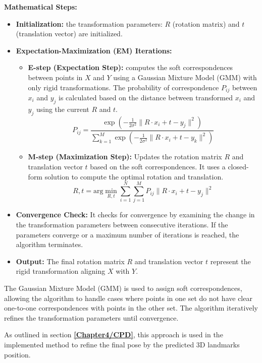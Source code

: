 \textbf{Mathematical Steps:}
\begin{itemize}
    \item \textbf{Initialization:} the transformation parameters: \(R\) (rotation matrix) and \(t\) (translation vector) are initialized.
    \item \textbf{Expectation-Maximization (EM) Iterations:}
    \begin{itemize}
        \item \textbf{E-step (Expectation Step):} computes the soft correspondences between points in \(X\) and \(Y\) using a Gaussian Mixture Model (GMM) with only rigid transformations. The probability of correspondence \(P_{ij}\) between \(x_i\) and \(y_j\) is calculated based on the distance between transformed \(x_i\) and \(y_j\) using the current \(R\) and \(t\).
        \begin{equation}
            P_{ij} = \frac{\exp\left(-\frac{1}{2\sigma^2}\|R \cdot x_i + t - y_j\|^2\right)}{\sum_{k=1}^M \exp\left(-\frac{1}{2\sigma^2}\|R \cdot x_i + t - y_k\|^2\right)}
        \end{equation}
        \item \textbf{M-step (Maximization Step):} Updates the rotation matrix \(R\) and translation vector \(t\) based on the soft correspondences. It uses a closed-form solution to compute the optimal rotation and translation.
        \begin{equation}
            R, t = \text{arg}\min_{R, t} \sum_{i=1}^N \sum_{j=1}^M P_{ij} \|R \cdot x_i + t - y_j\|^2
        \end{equation}
    \end{itemize}
    \item \textbf{Convergence Check:} It checks for convergence by examining the change in the transformation parameters between consecutive iterations. If the parameters converge or a maximum number of iterations is reached, the algorithm terminates.
        \item \textbf{Output:} The final rotation matrix \(R\) and translation vector \(t\) represent the rigid transformation aligning \(X\) with \(Y\).
\end{itemize}

The Gaussian Mixture Model (GMM) is used to assign soft correspondences, allowing the algorithm to handle cases where points in one set do not have clear one-to-one correspondences with points in the other set. The algorithm iteratively refines the transformation parameters until convergence.

As outlined in section \textbf{\ref{Chapter4/CPD}}, this approach is used in the implemented method to refine the final pose by the predicted 3D landmarks position.